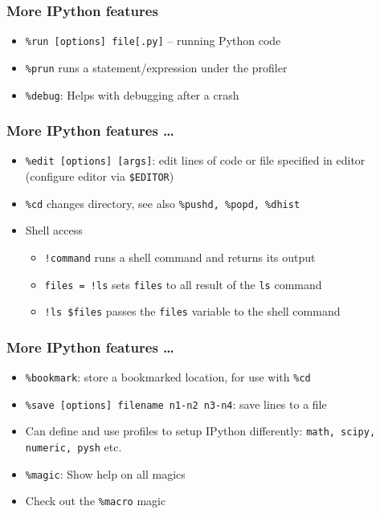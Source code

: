 \documentclass[14pt,compress]{beamer}
\begin{document}
\begin{frame}[fragile]
  \frametitle{More IPython features}
  \begin{itemize}
  \item \verb+%run [options] file[.py]+ -- running Python code
  \item \verb+%prun+ runs a statement/expression under the profiler
  \item \verb+%debug+: Helps with debugging after a crash
  \end{itemize}
\end{frame}

\begin{frame}[fragile]
  \frametitle{More IPython features \ldots}
  \begin{itemize}
  \item \verb+%edit [options] [args]+: edit lines of code or file
    specified in editor (configure editor via \verb+$EDITOR+)
  \item \verb+%cd+ changes directory, see also \verb+%pushd, %popd, %dhist+
  \item Shell access
    \begin{itemize}
    \item \verb+!command+ runs a shell command and returns its output
    \item \verb+files = !ls+ sets
      \verb+files+ to all result of the \verb+ls+ command
    \item \verb+!ls $files+ passes the \verb+files+ variable to the
      shell command
  \end{itemize}
    \end{itemize}
\end{frame}

\begin{frame}[fragile]
  \frametitle{More IPython features \ldots}
  \begin{itemize}
  \item \verb+%bookmark+: store a bookmarked location, for use with \verb+%cd+
  \item \verb+%save [options] filename n1-n2 n3-n4+: save lines to a
    file
  \item Can define and use profiles to setup IPython differently:
    \verb+math, scipy, numeric, pysh+ etc.
  \item \verb+%magic+: \alert{Show help on all magics}
  \item Check out the \verb+%macro+ magic
  \end{itemize}
\end{frame}
\end{document}
